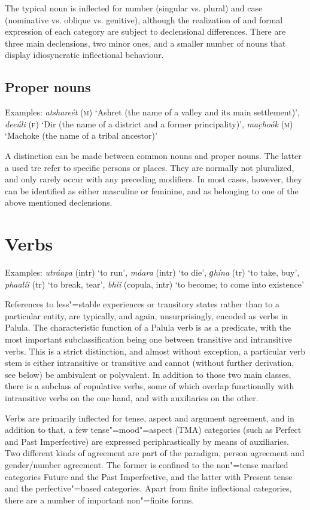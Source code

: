 The typical noun is inflected for number (singular vs. plural) and case (nominative vs. oblique vs. genitive), although the realization of and formal expression of each category are subject to declensional differences. There are three main declensions, two minor ones, and a smaller number of nouns that display idiosyncratic inflectional behaviour.


\subsection{Proper nouns}
\label{subsec:3b-2-1}
Examples: \textit{atshareét} (\textsc{m}) `Ashret (the name of a valley and its main settlement)', \textit{deeúli} (\textsc{f}) `Dir (the name of a district and a former principality)', \textit{mac̣hoók} (\textsc{m}) `Machoke (the name of a tribal ancestor)'


A distinction can be made between common nouns and proper nouns. The latter a used tre refer to specific persons or places. They are normally not pluralized, and only rarely occur with any preceding modifiers. In most cases, however, they can be identified as either masculine or feminine, and as belonging to one of the above mentioned declensions.

\section{Verbs}
\label{sec:3b-3}

Examples: \textit{utráapa} (intr) `to run', \textit{máara} (intr) `to die', \textit{ɡhína} (tr) `to take, buy', \textit{phaalíi} (tr) `to break, tear', \textit{bhíi} (copula, intr) `to become; to come into existence'


References to less"=stable experiences or transitory states rather than to a particular entity, are typically, and again, unsurprisingly, encoded as verbs in Palula. The characteristic function of a Palula verb is as a predicate, with the most important subclassification being one between transitive and intransitive verbs. This is a strict distinction, and almost without exception, a particular verb stem is either intransitive or transitive and cannot (without further derivation, see below) be ambivalent or polyvalent. In addition to those two main classes, there is a subclass of copulative verbs, some of which overlap functionally with intransitive verbs on the one hand, and with auxiliaries on the other.


Verbs are primarily inflected for tense, aspect and argument agreement, and in addition to that, a few tense"=mood"=aspect (TMA) categories (such as Perfect and Past Imperfective) are expressed periphrastically by means of auxiliaries. Two different kinds of agreement are part of the paradigm, person agreement and gender/number agreement. The former is confined to the non"=tense marked categories Future and the Past Imperfective, and the latter with Present tense and the perfective"=based categories. Apart from finite inflectional categories, there are a number of important non"=finite forms.


